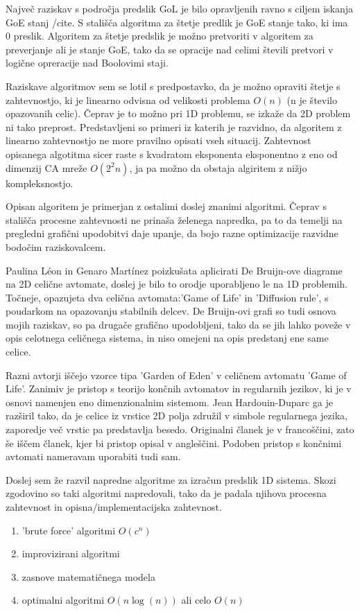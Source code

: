 \documentclass[12pt,a4paper,openany]{book}
\begin{document}
Največ raziskav s področja predslik GoL je bilo opravljenih ravno s ciljem iskanja GoE stanj /cite{}.
S stališča algoritma za štetje predlik je GoE stanje tako, ki ima 0 preslik.
Algoritem za štetje predslik je možno pretvoriti v algoritem za preverjanje ali je stanje GoE,
tako da se opracije nad celimi števili pretvori v logične opreracije nad Boolovimi staji.

Raziskave algoritmov sem se lotil s predpostavko, da je možno opraviti štetje s zahtevnostjo,
ki je linearno odvisna od velikosti problema \( O(n) \)  (n je število opazovanih celic). Čeprav je to možno pri 1D problemu,
se izkaže da 2D problem ni tako preprost. Predstavljeni so primeri iz katerih je razvidno,
da algoritem z linearno zahtevnostjo ne more pravilno opisati vseh situacij.
Zahtevnost opisanega algotitma sicer raste s kvadratom eksponenta eksponentno z eno
od dimenzij CA mreže  \( O(2^2n) \), ja pa možno da obstaja algiritem z nižjo kompleksnostjo.

Opisan algoritem je primerjan z ostalimi doslej znanimi algoritmi. Čeprav s stališča procesne
zahtevnosti ne prinaša želenega napredka, pa to da temelji na pregledni grafični upodobitvi
daje upanje, da bojo razne optimizacije razvidne bodočim raziskovalcem.

Paulina Léon in Genaro Martínez \cite{PaulinaGenaro2016} poizkušata aplicirati
De Bruijn-ove diagrame na 2D celične avtomate, doslej je bilo to orodje uporabljeno le na 1D problemih.
Točneje, opazujeta dva celična avtomata:'Game of Life' in 'Diffusion rule',
s poudarkom na opazovanju stabilnih delcev. De Bruijn-ovi grafi so tudi osnova mojih raziskav,
so pa drugače grafično upodobljeni, tako da se jih lahko poveže v opis celotnega celičnega sistema,
in niso omejeni na opis predstanj ene same celice.

Razni avtorji \cite{Hartman2013} iščejo vzorce tipa 'Garden of Eden' v celičnem avtomatu 'Game of Life'.
Zanimiv je pristop s teorijo končnih avtomatov in regularnih jezikov, ki je v
osnovi namenjen eno dimenzionalnim sistemom. Jean Hardouin-Duparc ga je razširil
tako, da je celice iz vrstice 2D polja združil v simbole regularnega jezika, zaporedje več
vrstic pa predstavlja besedo. Originalni članek je v francoščini, zato še iščem članek,
kjer bi pristop opisal v angleščini. Podoben pristop s končnimi avtomati nameravam uporabiti tudi sam.

Doslej sem že razvil napredne algoritme za izračun predslik 1D sistema.
Skozi zgodovino so taki algoritmi napredovali, tako da je padala njihova
procesna zahtevnost in opisna/implementacijska zahtevnost.
\begin{enumerate}
 \item 'brute force' algoritmi \( O(c^n) \)
 \item improvizirani algoritmi
 \item zasnove matematičnega modela
 \item optimalni algoritmi \( O(n \log(n)) \) ali celo \( O(n) \)
\end{enumerate}
\end{document}
